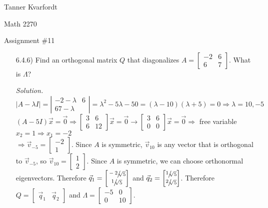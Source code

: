 \documentclass[12pt,pdftex]{article}
\begin{document}
\hfill Tanner Kvarfordt

\hfill Math 2270

\hfill Assignment \#11

\begin{itemize}
\item[6.4.6)] Find an orthogonal matrix $Q$ that diagonalizes 
$A=\begin{bmatrix}
-2 & 6 \\ 6 & 7
\end{bmatrix}$. What is $\Lambda$?

\textit{Solution.}
$|A-\lambda I|= \left|\begin{matrix}
-2 - \lambda & 6 \\ 6 7 -\lambda
\end{matrix}\right|=\lambda^2-5\lambda-50=(\lambda-10)(\lambda+5)=0\Rightarrow\lambda=10,-5$
 $(A-5I)\vec{x}=\vec{0}\Rightarrow\begin{bmatrix}
3 & 6 \\ 6 & 12
\end{bmatrix}\vec{x}=\vec{0}\longrightarrow\begin{bmatrix}
3 & 6 \\ 0 & 0
\end{bmatrix}\vec{x}=\vec{0}\Rightarrow$ free variable $x_2=1\Rightarrow x_1=-2$ \\
$\Rightarrow\vec{v}_{-5}=\begin{bmatrix}-2 \\ 1\end{bmatrix}$. Since $A$ is symmetric, $\vec{v}_{10}$ is any vector 
that is orthogonal to $\vec{v}_{-5}$, so $\vec{v}_{10}=\begin{bmatrix}1 \\ 2\end{bmatrix}$. Since $A$ is symmetric,
we can choose orthonormal eigenvectors. Therefore 
$\vec{q}_1=\begin{bmatrix}\sfrac{-2}{\sqrt[]{5}} \\ \sfrac{1}{\sqrt[]{5}}\end{bmatrix}$ and 
$\vec{q}_2=\begin{bmatrix}\sfrac{1}{\sqrt[]{5}} \\ \sfrac{2}{\sqrt[]{5}}\end{bmatrix}$. Therefore
$Q=\begin{bmatrix}\vec{q}_1 & \vec{q}_2\end{bmatrix}$ and 
$\Lambda=\begin{bmatrix}-5 & 0 \\ 0 & 10\end{bmatrix}$.


\end{itemize}
\end{document}
